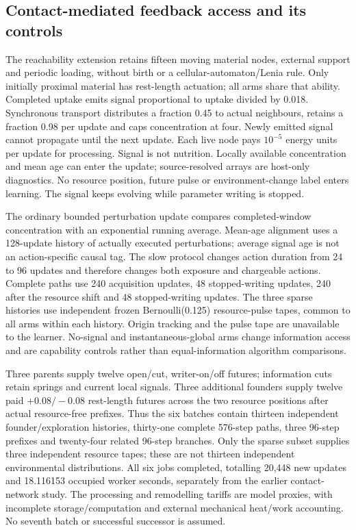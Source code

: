 
\subsection*{Contact-mediated feedback access and its controls}

The reachability extension retains fifteen moving material nodes, external support and periodic loading, without birth or a cellular-automaton/Lenia rule. Only initially proximal material has rest-length actuation; all arms share that ability. Completed uptake emits signal proportional to uptake divided by 0.018. Synchronous transport distributes a fraction 0.45 to actual neighbours, retains a fraction 0.98 per update and caps concentration at four. Newly emitted signal cannot propagate until the next update. Each live node pays $10^{-5}$ energy units per update for processing. Signal is not nutrition. Locally available concentration and mean age can enter the update; source-resolved arrays are host-only diagnostics. No resource position, future pulse or environment-change label enters learning. The signal keeps evolving while parameter writing is stopped.

The ordinary bounded perturbation update compares completed-window concentration with an exponential running average. Mean-age alignment uses a 128-update history of actually executed perturbations; average signal age is not an action-specific causal tag. The slow protocol changes action duration from 24 to 96 updates and therefore changes both exposure and chargeable actions. Complete paths use 240 acquisition updates, 48 stopped-writing updates, 240 after the resource shift and 48 stopped-writing updates. The three sparse histories use independent frozen Bernoulli(0.125) resource-pulse tapes, common to all arms within each history. Origin tracking and the pulse tape are unavailable to the learner. No-signal and instantaneous-global arms change information access and are capability controls rather than equal-information algorithm comparisons.

Three parents supply twelve open/cut, writer-on/off futures; information cuts retain springs and current local signals. Three additional founders supply twelve paid $+0.08/-0.08$ rest-length futures across the two resource positions after actual resource-free prefixes. Thus the six batches contain thirteen independent founder/exploration histories, thirty-one complete 576-step paths, three 96-step prefixes and twenty-four related 96-step branches. Only the sparse subset supplies three independent resource tapes; these are not thirteen independent environmental distributions. All six jobs completed, totalling 20,448 new updates and 18.116153 occupied worker seconds, separately from the earlier contact-network study. The processing and remodelling tariffs are model proxies, with incomplete storage/computation and external mechanical heat/work accounting. No seventh batch or successful successor is assumed.
